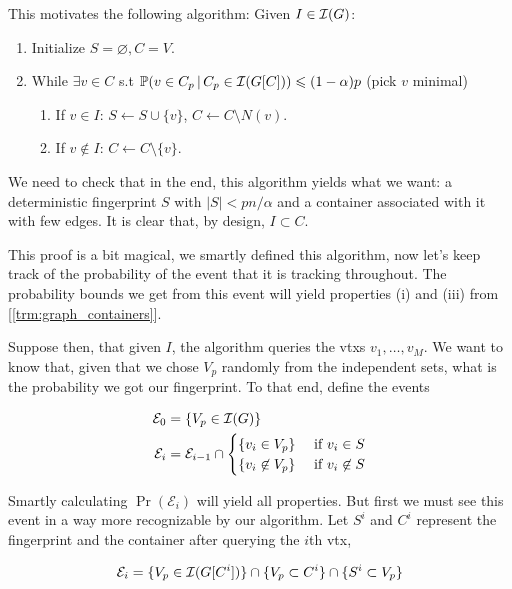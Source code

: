 This motivates the following algorithm: Given $I \in \mathcal{I}(G)$:
\begin{enumerate}
	\item Initialize $S = \varnothing, C = V$.
	\item While $\exists v \in C$ s.t $\mathbb{P}(v \in C_p\, |\, C_p \in
		\mathcal{I}(G[C])) \leqslant (1-\alpha)p$ (pick $v$ minimal)
		\begin{enumerate}
			\item If $v \in I$: $S \leftarrow S \cup \{v\}$, $C \leftarrow C
				\setminus N(v)$.
			\item If $v \not \in I$: $C \leftarrow C \setminus \{v\}$.
		\end{enumerate}
\end{enumerate}

We need to check that in the end, this algorithm yields what we want:
a deterministic fingerprint $S$ with $|S| < pn/\alpha$
and a container associated with it with few edges. It is clear that,
by design, $I \subset C$.

This proof is a bit magical, we smartly defined this algorithm, now
let's keep track of the probability of the event that it is tracking throughout.
The probability bounds we get from this event will yield properties
(i) and (iii) from [\ref{trm:graph_containers}].

Suppose then, that given $I$, the algorithm queries the vtxs $v_1,
\dots, v_M$. We want to know
that, given that we chose $V_p$ randomly from the independent sets,
what is the probability we got our fingerprint.
To that end, define the events

\begin{align}
	\mathcal{E}_0 &= \{V_p \in \mathcal{I}(G)\}\\
	\mathcal{E}_i &= \mathcal{E}_{i-1} \cap
	\begin{cases}
		\{v_i \in V_p\} & \text{ if } v_i \in S\\
		\{v_i \not \in V_p\} & \text{ if } v_i \not \in S
	\end{cases}
\end{align}

Smartly calculating $\Pr(\mathcal{E}_i)$ will yield all properties.
But first we must see this event in
a way more recognizable by our algorithm. Let $S^i$ and $C^i$
represent the fingerprint and the container after querying the $i$th vtx,

\begin{claim}
	\[\mathcal{E}_i = \{V_p \in \mathcal{I}(G[C^{i}])\} \cap \{V_p
	\subset C^{i}\} \cap \{S^i \subset V_p\} \]
\end{claim}

